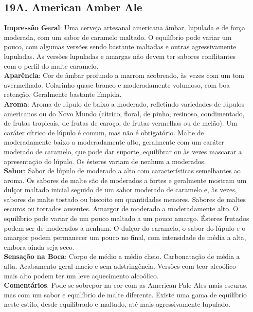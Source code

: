 \subsection*{19A. American Amber Ale}
\textbf{Impressão Geral}: Uma cerveja artesanal americana âmbar, lupulada e de força moderada, com um sabor de caramelo maltado. O equilíbrio pode variar um pouco, com algumas versões sendo bastante maltadas e outras agressivamente lupuladas. As versões lupuladas e amargas não devem ter sabores conflitantes com o perfil do malte caramelo. \\
\textbf{Aparência}: Cor de âmbar profundo a marrom acobreado, às vezes com um tom avermelhado. Colarinho quase branco e moderadamente volumoso, com boa retenção. Geralmente bastante límpida. \\
\textbf{Aroma}: Aroma de lúpulo de baixo a moderado, refletindo variedades de lúpulos americanos ou do Novo Mundo (cítrico, floral, de pinho, resinoso, condimentado, de frutas tropicais, de frutas de caroço, de frutas vermelhas ou de melão). Um caráter cítrico de lúpulo é comum, mas não é obrigatório. Malte de moderadamente baixo a moderadamente alto, geralmente com um caráter moderado de caramelo, que pode dar suporte, equilibrar ou às vezes mascarar a apresentação do lúpulo. Os ésteres variam de nenhum a moderados. \\
\textbf{Sabor}: Sabor de lúpulo de moderado a alto com características semelhantes ao aroma. Os sabores de malte são de moderados a fortes e geralmente mostram um dulçor maltado inicial seguido de um sabor moderado de caramelo e, às vezes, sabores de malte tostado ou biscoito em quantidades menores. Sabores de maltes escuros ou torrados ausentes. Amargor de moderado a moderadamente alto. O equilíbrio pode variar de um pouco maltado a um pouco amargo. Ésteres frutados podem ser de moderados a nenhum. O dulçor do caramelo, o sabor do lúpulo e o amargor podem permanecer um pouco no final, com intensidade de média a alta, embora ainda seja seco. \\
\textbf{Sensação na Boca}: Corpo de médio a médio cheio. Carbonatação de média a alta. Acabamento geral macio e sem adstringência. Versões com teor alcoólico mais alto podem ter um leve aquecimento alcoólico. \\
\textbf{Comentários}: Pode se sobrepor na cor com as American Pale Ales mais escuras, mas com um sabor e equilíbrio de malte diferente. Existe uma gama de equilíbrio neste estilo, desde equilibrado e maltado, até mais agressivamente lupulado. \\

